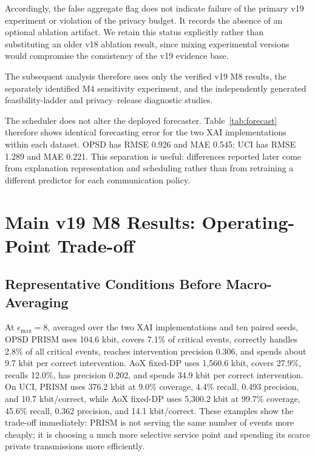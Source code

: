 \documentclass[11pt]{article}
\begin{document}
Accordingly, the false aggregate flag does not indicate failure of the primary v19 experiment or violation of the privacy budget. It records the absence of an optional ablation artifact. We retain this status explicitly rather than substituting an older v18 ablation result, since mixing experimental versions would compromise the consistency of the v19 evidence base.

The subsequent analysis therefore uses only the verified v19 M8 results, the separately identified M4 sensitivity experiment, and the independently generated feasibility-ladder and privacy--release diagnostic studies.



The scheduler does not alter the deployed forecaster. Table~\ref{tab:forecast} therefore shows identical forecasting error for the two XAI implementations within each dataset. OPSD has RMSE 0.926 and MAE 0.545; UCI has RMSE 1.289 and MAE 0.221. This separation is useful: differences reported later come from explanation representation and scheduling rather than from retraining a different predictor for each communication policy.




\section{Main v19 M8 Results: Operating-Point Trade-off}

\subsection*{Representative Conditions Before Macro-Averaging}
At $\epsilon_{\max}=8$, averaged over the two XAI implementations and ten paired seeds, OPSD PRISM uses 104.6 kbit, covers 7.1\% of critical events, correctly handles 2.8\% of all critical events, reaches intervention precision 0.306, and spends about 9.7 kbit per correct intervention. AoX fixed-DP uses 1,560.6 kbit, covers 27.9\%, recalls 12.0\%, has precision 0.202, and spends 34.9 kbit per correct intervention. On UCI, PRISM uses 376.2 kbit at 9.0\% coverage, 4.4\% recall, 0.493 precision, and 10.7 kbit/correct, while AoX fixed-DP uses 5,300.2 kbit at 99.7\% coverage, 45.6\% recall, 0.362 precision, and 14.1 kbit/correct. These examples show the trade-off immediately: PRISM is not serving the same number of events more cheaply; it is choosing a much more selective service point and spending its scarce private transmissions more efficiently.
\end{document}
